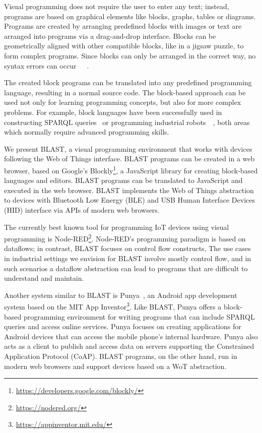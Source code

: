\documentclass[runningheads]{llncs}
\begin{document}
Visual programming does not require the user to enter any text; instead, programs are based on graphical elements like blocks, graphs, tables or diagrams.
Programs are created by arranging predefined blocks with images or text are arranged into programs via a drag-and-drop interface.
Blocks can be geometrically aligned with other compatible blocks, like in a jigsaw puzzle, to form complex programs.
Since blocks can only be arranged in the correct way, no syntax errors can occur~\cite{10.11453341221}~\cite{maloney2010scratch}~\cite{10.1145/1089733.1089734}.

The created block programs can be translated into any predefined programming language, resulting in a normal source code. 
The block-based approach can be used not only for learning programming concepts, but also for more complex problems.
For example, block languages have been successfully used in constructing SPARQL queries~\cite{7369012} or programming industrial robots~\cite{8120406}~\cite{tomlein2017visual}, both areas which normally require advanced programming skills.

We present BLAST, a visual programming environment that works with devices following the Web of Things interface.
BLAST programs can be created in a web browser, based on Google's Blockly\footnote{\url{https://developers.google.com/blockly/}}, a JavaScript library for creating block-based languages and editors.
BLAST programs can be translated to JavaScript and executed in the web browser.
BLAST implements the Web of Things abstraction to devices with Bluetooth Low Energy (BLE) and USB Human Interface Devices (HID) interface via APIs of modern web browsers.

The currently best known tool for programming IoT devices using visual programming is Node-RED\footnote{\url{https://nodered.org/}}.
Node-RED's programming paradigm is based on dataflows; in contrast, BLAST focuses on control flow constructs,
The use cases in industrial settings we envision for BLAST involve mostly control flow, and in such scenarios a dataflow abstraction can lead to programs that are difficult to understand and maintain.

Another system similar to BLAST is Punya~\cite{patton2021punya}, an Android app development system based on the MIT App Inventor\footnote{\url{https://appinventor.mit.edu/}}.
Like BLAST, Punya offers a block-based programming environment for writing programs that can include SPARQL queries and access online services.
Punya focuses on creating applications for Android devices that can access the mobile phone's internal hardware.
Punya also acts as a client to publish and access data on servers supporting the Constrained Application Protocol (CoAP).
BLAST programs, on the other hand, run in modern web browsers and support devices based on a WoT abstraction.
\end{document}
